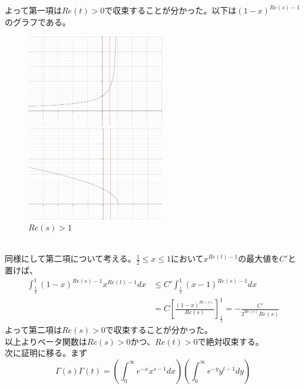 \documentclass{jsarticle}
\begin{document}
よって第一項は\(Re(t)>0\)で収束することが分かった。以下は\((1-x)^{Re(s)-1}\)のグラフである。
\begin{figure}[h]
  \begin{minipage}{0.5\hsize}
    \begin{center}
      \includegraphics[width=60mm]{zeta-photo3.jpg}
     
    \end{center}
    \caption{\(Re(s)<1\)}
   
  \end{minipage}
  \begin{minipage}{0.5\hsize}
    \begin{center}
      \includegraphics[width=60mm]{zeta-photo4.jpg}
    \end{center}
    \caption{\(Re(s)>1\)}
  \end{minipage}
\end{figure}
\\同様にして第二項について考える。\(\frac{1}{2}\leq x\leq1\)において\(x^{Re(t)-1}\)の最大値を\(C'\)と置けば、
\begin{align*}
\int_{\frac{1}{2}}^{1}(1-x)^{Re(s)-1}x^{Re(t)-1}dx&\leq C'\int_{\frac{1}{2}}^{1}(x-1)^{Re(s)-1}dx\\
&=C\left[\frac{(1-x)^{Re(s)}}{Re(s)}\right]_{\frac{1}{2}}^{1}=-\frac{C'}{2^{Re(s)}Re(s)}
\end{align*}
よって第二項は\(Re(s)>0\)で収束することが分かった。\\
以上よりベータ関数は\(Re(s)>0\)かつ、\(Re(t)>0\)で絶対収束する。\\
次に証明に移る。まず
\[\Gamma(s)\Gamma(t)=\left(\int_{0}^{\infty}e^{-x}x^{s-1}dx\right)\left(\int_{0}^{\infty}e^{-y}y^{t-1}dy\right)\]
\end{document}
